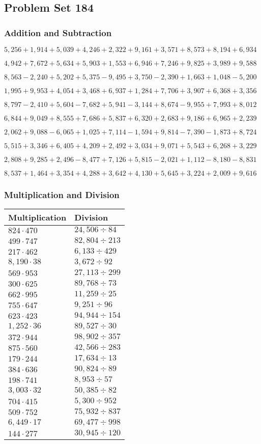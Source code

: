 \hypertarget{problem-set-184}{%
\subsection{Problem Set 184}\label{problem-set-184}}

\hypertarget{addition-and-subtraction}{%
\subsubsection{Addition and
Subtraction}\label{addition-and-subtraction}}

\(5,256+1,914+5,039+4,246+2,322+9,161+3,571+8,573+8,194+6,934\)

\(4,942+7,672+5,634+5,903+1,553+6,946+7,246+9,825+3,989+9,588\)

\(8,563-2,240+5,202+5,375-9,495+3,750-2,390+1,663+1,048-5,200\)

\(1,995+9,953+4,054+3,468+6,937+1,284+7,706+3,907+6,368+3,356\)

\(8,797-2,410+5,604-7,682+5,941-3,144+8,674-9,955+7,993+8,012\)

\(6,844+9,049+8,555+7,686+5,837+6,320+2,683+9,186+6,965+2,239\)

\(2,062+9,088-6,065+1,025+7,114-1,594+9,814-7,390-1,873+8,724\)

\(5,515+3,346+6,405+4,209+2,492+3,034+9,071+5,543+6,268+3,229\)

\(2,808+9,285+2,496-8,477+7,126+5,815-2,021+1,112-8,180-8,831\)

\(8,537+1,464+3,354+4,288+3,642+4,130+5,645+3,224+2,009+9,616\)

\hypertarget{multiplication-and-division}{%
\subsubsection{Multiplication and
Division}\label{multiplication-and-division}}

\begin{longtable}[]{@{}ll@{}}
\toprule
Multiplication & Division\tabularnewline
\midrule
\endhead
\(824\cdot470\) & \(24,506÷84\)\tabularnewline
\(499\cdot747\) & \(82,804÷213\)\tabularnewline
\(217\cdot462\) & \(6,133÷429\)\tabularnewline
\(8,190\cdot38\) & \(3,672÷92\)\tabularnewline
\(569\cdot953\) & \(27,113÷299\)\tabularnewline
\(300\cdot625\) & \(89,768÷73\)\tabularnewline
\(662\cdot995\) & \(11,259÷25\)\tabularnewline
\(755\cdot647\) & \(9,251÷96\)\tabularnewline
\(623\cdot423\) & \(94,944÷154\)\tabularnewline
\(1,252\cdot36\) & \(89,527÷30\)\tabularnewline
\(372\cdot944\) & \(98,902÷357\)\tabularnewline
\(875\cdot560\) & \(42,566÷283\)\tabularnewline
\(179\cdot244\) & \(17,634÷13\)\tabularnewline
\(384\cdot636\) & \(90,824÷89\)\tabularnewline
\(198\cdot741\) & \(8,953÷57\)\tabularnewline
\(3,003\cdot32\) & \(50,385÷82\)\tabularnewline
\(704\cdot415\) & \(5,300÷952\)\tabularnewline
\(509\cdot752\) & \(75,932÷837\)\tabularnewline
\(6,449\cdot17\) & \(69,477÷998\)\tabularnewline
\(144\cdot277\) & \(30,945÷120\)\tabularnewline
\bottomrule
\end{longtable}
